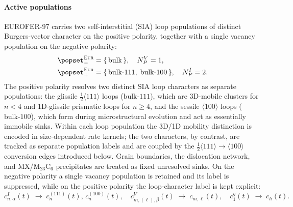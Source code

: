 \paragraph{Active populations}
\textsc{EUROFER-97} carries two self-interstitial (SIA) loop populations of
distinct Burgers-vector character on the positive polarity, together with a
single vacancy population on the negative polarity:
\begin{align}
   \popset_{-}^{\textsc{Eur}} &= \{\,\mathrm{bulk}\,\},
   \quad N_P^V = 1,
   \label{eq:eurofer_vac_pop}\\
   \popset_{+}^{\textsc{Eur}} &= \{\,\mathrm{bulk\text{-}111},\;\mathrm{bulk\text{-}100}\,\},
   \quad N_P^I = 2.
   \label{eq:eurofer_sia_pop}
\end{align}
The positive polarity resolves two distinct SIA loop characters as separate
populations: the glissile $\tfrac{1}{2}\langle 111\rangle$ loops
($\mathrm{bulk\text{-}111}$), which are 3D-mobile clusters for $n<4$ and
1D-glissile prismatic loops for $n\geq 4$, and the sessile $\langle 100\rangle$
loops ($\mathrm{bulk\text{-}100}$), which form during microstructural evolution
and act as essentially immobile sinks. Within each loop population the 3D/1D
mobility distinction is encoded in size-dependent rate kernels; the two
characters, by contrast, are tracked as separate population labels and are
coupled by the $\tfrac{1}{2}\langle 111\rangle\!\to\!\langle 100\rangle$
conversion edges introduced below. Grain boundaries, the dislocation network,
and MX/M$_{23}$C$_6$ precipitates are treated as fixed unresolved sinks.
On the negative polarity a single vacancy population is retained and its label
is suppressed, while on the positive polarity the loop-character label is kept
explicit:
\begin{equation}
   c^I_{n,\alpha}(t) \;\rightarrow\; c^{(111)}_n(t),\,c^{(100)}_n(t),
   \quad
   c^V_{m,(\ell),\beta}(t) \;\rightarrow\; c_{m,\ell}(t),
   \quad
   c^g_1(t) \;\rightarrow\; c_h(t).
   \label{eq:eurofer_variable_reduction}
\end{equation}

